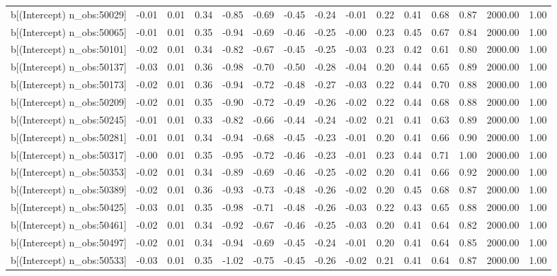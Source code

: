 \begin{table}[ht]
\begin{tabular}{rrrrrrrrrrrrrrr}
  b[(Intercept) n\_obs:50029] & -0.01 & 0.01 & 0.34 & -0.85 & -0.69 & -0.45 & -0.24 & -0.01 & 0.22 & 0.41 & 0.68 & 0.87 & 2000.00 & 1.00 \\ 
  b[(Intercept) n\_obs:50065] & -0.01 & 0.01 & 0.35 & -0.94 & -0.69 & -0.46 & -0.25 & -0.00 & 0.23 & 0.45 & 0.67 & 0.84 & 2000.00 & 1.00 \\ 
  b[(Intercept) n\_obs:50101] & -0.02 & 0.01 & 0.34 & -0.82 & -0.67 & -0.45 & -0.25 & -0.03 & 0.23 & 0.42 & 0.61 & 0.80 & 2000.00 & 1.00 \\ 
  b[(Intercept) n\_obs:50137] & -0.03 & 0.01 & 0.36 & -0.98 & -0.70 & -0.50 & -0.28 & -0.04 & 0.20 & 0.44 & 0.65 & 0.89 & 2000.00 & 1.00 \\ 
  b[(Intercept) n\_obs:50173] & -0.02 & 0.01 & 0.36 & -0.94 & -0.72 & -0.48 & -0.27 & -0.03 & 0.22 & 0.44 & 0.70 & 0.88 & 2000.00 & 1.00 \\ 
  b[(Intercept) n\_obs:50209] & -0.02 & 0.01 & 0.35 & -0.90 & -0.72 & -0.49 & -0.26 & -0.02 & 0.22 & 0.44 & 0.68 & 0.88 & 2000.00 & 1.00 \\ 
  b[(Intercept) n\_obs:50245] & -0.01 & 0.01 & 0.33 & -0.82 & -0.66 & -0.44 & -0.24 & -0.02 & 0.21 & 0.41 & 0.63 & 0.89 & 2000.00 & 1.00 \\ 
  b[(Intercept) n\_obs:50281] & -0.01 & 0.01 & 0.34 & -0.94 & -0.68 & -0.45 & -0.23 & -0.01 & 0.20 & 0.41 & 0.66 & 0.90 & 2000.00 & 1.00 \\ 
  b[(Intercept) n\_obs:50317] & -0.00 & 0.01 & 0.35 & -0.95 & -0.72 & -0.46 & -0.23 & -0.01 & 0.23 & 0.44 & 0.71 & 1.00 & 2000.00 & 1.00 \\ 
  b[(Intercept) n\_obs:50353] & -0.02 & 0.01 & 0.34 & -0.89 & -0.69 & -0.46 & -0.25 & -0.02 & 0.20 & 0.41 & 0.66 & 0.92 & 2000.00 & 1.00 \\ 
  b[(Intercept) n\_obs:50389] & -0.02 & 0.01 & 0.36 & -0.93 & -0.73 & -0.48 & -0.26 & -0.02 & 0.20 & 0.45 & 0.68 & 0.87 & 2000.00 & 1.00 \\ 
  b[(Intercept) n\_obs:50425] & -0.03 & 0.01 & 0.35 & -0.98 & -0.71 & -0.48 & -0.26 & -0.03 & 0.22 & 0.43 & 0.65 & 0.88 & 2000.00 & 1.00 \\ 
  b[(Intercept) n\_obs:50461] & -0.02 & 0.01 & 0.34 & -0.92 & -0.67 & -0.46 & -0.25 & -0.03 & 0.20 & 0.41 & 0.64 & 0.82 & 2000.00 & 1.00 \\ 
  b[(Intercept) n\_obs:50497] & -0.02 & 0.01 & 0.34 & -0.94 & -0.69 & -0.45 & -0.24 & -0.01 & 0.20 & 0.41 & 0.64 & 0.85 & 2000.00 & 1.00 \\ 
  b[(Intercept) n\_obs:50533] & -0.03 & 0.01 & 0.35 & -1.02 & -0.75 & -0.45 & -0.26 & -0.02 & 0.21 & 0.41 & 0.64 & 0.87 & 2000.00 & 1.00 \\ 

\end{tabular}
\end{table}
